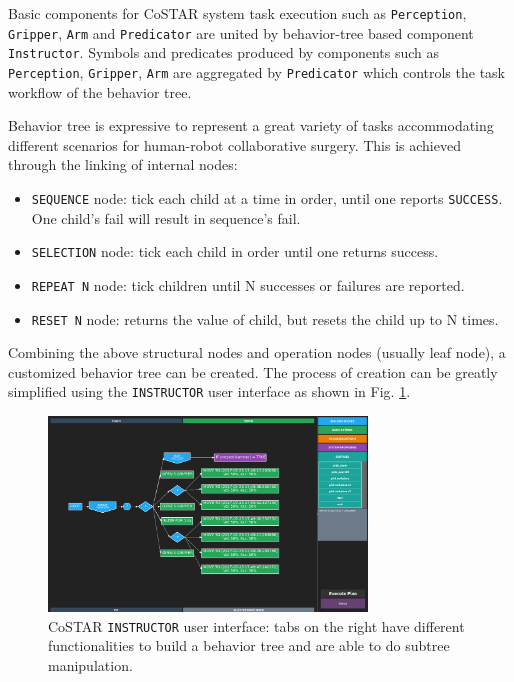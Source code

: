 \documentclass[letterpaper, 10 pt, conference]{ieeeconf}
\begin{document}
Basic components for CoSTAR system task execution such as \texttt{Perception}, \texttt{Gripper}, \texttt{Arm} and \texttt{Predicator} are united by behavior-tree based component \texttt{Instructor}. Symbols and predicates produced by components such as \texttt{Perception}, \texttt{Gripper}, \texttt{Arm} are aggregated by \texttt{Predicator} which controls the task workflow of the behavior tree. 

Behavior tree is expressive to represent a great variety of tasks accommodating different scenarios for human-robot collaborative surgery. This is achieved through the linking of internal nodes:
 
\begin{itemize}
\item \texttt{SEQUENCE} node: tick each child at a time in order, until one reports \texttt{SUCCESS}. One child's fail will result in sequence's fail.
\item \texttt{SELECTION} node: tick each child in order until one returns success.
\item \texttt{REPEAT N} node: tick children until N successes or failures are reported.
\item \texttt{RESET N} node: returns the value of child, but resets the child up to N times.
\end{itemize} 

Combining the above structural nodes and operation nodes (usually leaf node), a customized behavior tree can be created. The process of creation can be greatly simplified using the \texttt{INSTRUCTOR} user interface as shown in Fig. \ref{fig:instructor}.

\begin{figure}[bt]
\centering
\includegraphics[width=240pt]{instructor.png}
\caption{CoSTAR \texttt{INSTRUCTOR} user interface: tabs on the right have different functionalities to build a behavior tree and are able to do subtree manipulation. }
\label{fig:instructor}
\end{figure}
\end{document}
